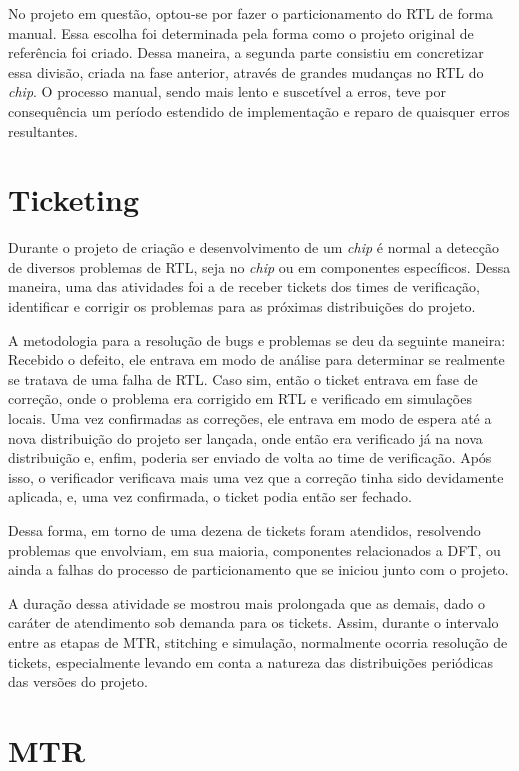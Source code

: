 \documentclass[
	12pt,				%
    oneside,			%
	a4paper,			%
	english,			%
	french,				%
	spanish,			%
	brazil				%
	]{abntex2}
\begin{document}
No projeto em questão, optou-se por fazer o particionamento do RTL de forma manual. Essa escolha foi determinada pela forma como o projeto original de referência foi criado. Dessa maneira, a segunda parte consistiu em concretizar essa divisão, criada na fase anterior, através de grandes mudanças no RTL do \textit{chip}. O processo manual, sendo mais lento e suscetível a erros, teve por consequência um período estendido de implementação e reparo de quaisquer erros resultantes.

\section{Ticketing}

Durante o projeto de criação e desenvolvimento de um \textit{chip} é normal a detecção de diversos problemas de RTL, seja no \textit{chip} ou em componentes específicos. Dessa maneira, uma das atividades foi a de receber tickets dos times de verificação, identificar e corrigir os problemas para as próximas distribuições do projeto.

A metodologia para a resolução de bugs e problemas se deu da seguinte maneira: Recebido o defeito, ele entrava em modo de análise para determinar se realmente se tratava de uma falha de RTL. Caso sim, então o ticket entrava em fase de correção, onde o problema era corrigido em RTL e verificado em simulações locais. Uma vez confirmadas as correções, ele entrava em modo de espera até a nova distribuição do projeto ser lançada, onde então era verificado já na nova distribuição e, enfim, poderia ser enviado de volta ao time de verificação. Após isso, o verificador verificava mais uma vez que a correção tinha sido devidamente aplicada, e, uma vez confirmada, o ticket podia então ser fechado.

Dessa forma, em torno de uma dezena de tickets foram atendidos, resolvendo problemas que envolviam, em sua maioria, componentes relacionados a DFT, ou ainda a falhas do processo de particionamento que se iniciou junto com o projeto.

A duração dessa atividade se mostrou mais prolongada que as demais, dado o caráter de atendimento sob demanda para os tickets. Assim, durante o intervalo entre as etapas de MTR, stitching e simulação, normalmente ocorria resolução de tickets, especialmente levando em conta a natureza das distribuições periódicas das versões do projeto.

\section{MTR}
\end{document}
